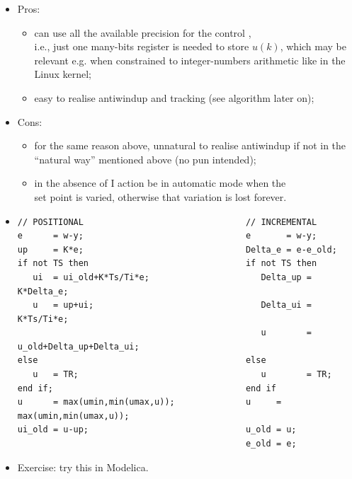 \begin{frame}
\myPause
 \begin{itemize}[<+-| alert@+>]
 \item Pros:
       \begin{itemize}[<+-| alert@+>]
       \item can use all the available precision for the control ,\\
             i.e., just one many-bits register is needed to store $u(k)$, which may be\\
             relevant e.g. when constrained to integer-numbers arithmetic like in the\\
             Linux kernel;
       \item easy to realise antiwindup and tracking (see algorithm later on);
       \end{itemize}
 \item Cons:
       \begin{itemize}[<+-| alert@+>]
       \item for the same reason above, unnatural to realise antiwindup if not in the\\
             ``natural way'' mentioned above (no pun intended);
       \item in the absence of I action  be in automatic mode when the\\
             set point is varied, otherwise that variation is lost forever.
       \end{itemize}
 \end{itemize}
\end{frame}

\begin{frame}[fragile]
\myPause
 \begin{itemize}[<+-| alert@+>]
 \item[]{\scriptsize
   \begin{verbatim}
// POSITIONAL                                // INCREMENTAL
e      = w-y;                                e       = w-y; 
up     = K*e;                                Delta_e = e-e_old;              
if not TS then                               if not TS then    
   ui  = ui_old+K*Ts/Ti*e;                      Delta_up = K*Delta_e;
   u   = up+ui;                                 Delta_ui = K*Ts/Ti*e;
                                                u        = u_old+Delta_up+Delta_ui;
else                                         else                 
   u   = TR;                                    u        = TR;
end if;                                      end if
u      = max(umin,min(umax,u));              u     = max(umin,min(umax,u));
ui_old = u-up;                               u_old = u;
                                             e_old = e;
   \end{verbatim}
   }
 \item Exercise: try this in Modelica.
 \end{itemize}
\end{frame}

